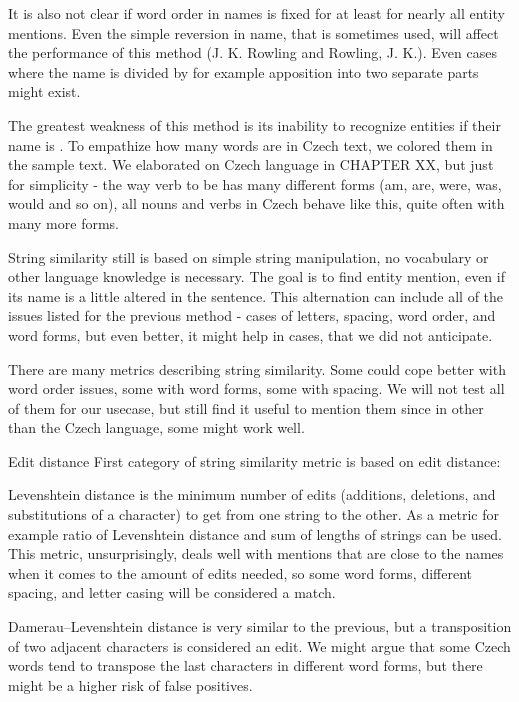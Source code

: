 It is also not clear if word order in names is fixed for at least for nearly all entity mentions. Even the simple reversion in name, that is sometimes used, will affect the performance of this method (J. K. Rowling and Rowling, J. K.).  Even cases where the name is divided by for example apposition into two separate parts might exist.

The greatest weakness of this method is its inability to recognize entities if their name is . To empathize how many words are  in Czech text, we colored them in the sample text.  We elaborated on Czech language in  CHAPTER XX, but just for simplicity - the way verb to be has many different forms (am, are, were, was, would and so on), all nouns and verbs in Czech behave like this, quite often with many more forms.

 String similarity still is based on simple string manipulation, no vocabulary or other language knowledge is necessary. The goal is to find entity mention, even if its name is a little altered in the sentence. This alternation can include all of the issues listed for the previous method - cases of letters, spacing, word order, and word forms, but even better, it might help in cases, that we did not anticipate.

There are many metrics describing string similarity. Some could cope better with word order issues, some with word forms, some with spacing. We will not test all of them for our usecase, but still find it useful to mention them since in other than the Czech language, some might work well.

Edit distance
First category of string similarity metric is based on edit distance:

Levenshtein distance is the minimum number of edits (additions, deletions, and substitutions of a character) to get from one string to the other. As a metric for example  ratio of Levenshtein distance and sum of lengths of strings can be used. This metric, unsurprisingly, deals well with mentions that are close to the names when it comes to the amount of edits needed, so some word forms, different spacing, and letter casing will be considered a match.

Damerau–Levenshtein distance is very similar to the previous, but a transposition of two adjacent characters is considered an edit. We might argue that some Czech words tend to transpose the last characters in different word forms, but there might be a higher risk of false positives.

